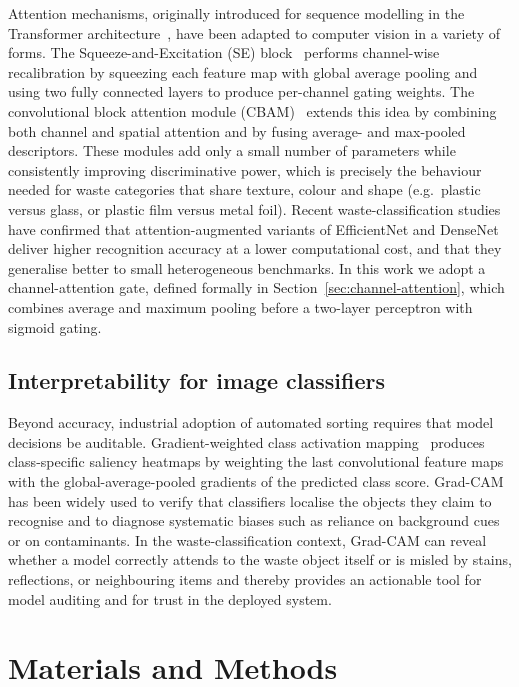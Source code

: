 \documentclass[a4paper,fleqn]{cas-dc}
\begin{document}
Attention mechanisms, originally introduced for sequence modelling in the
Transformer architecture~\cite{vaswani_attention}, have been adapted to
computer vision in a variety of forms. The Squeeze-and-Excitation (SE)
block~\cite{hu_senet} performs channel-wise recalibration by squeezing each
feature map with global average pooling and using two fully connected layers
to produce per-channel gating weights. The convolutional block attention
module (CBAM)~\cite{woo_cbam} extends this idea by combining both channel and
spatial attention and by fusing average- and max-pooled descriptors. These
modules add only a small number of parameters while consistently improving
discriminative power, which is precisely the behaviour needed for waste
categories that share texture, colour and shape (e.g.\ plastic versus glass,
or plastic film versus metal foil). Recent waste-classification studies have
confirmed that attention-augmented variants of EfficientNet and DenseNet
deliver higher recognition accuracy at a lower computational cost, and that
they generalise better to small heterogeneous benchmarks. In this work we
adopt a channel-attention gate, defined formally in
Section~\ref{sec:channel-attention}, which combines average and maximum
pooling before a two-layer perceptron with sigmoid gating.

\subsection{Interpretability for image classifiers}

Beyond accuracy, industrial adoption of automated sorting requires that model
decisions be auditable. Gradient-weighted class activation
mapping~\cite{selvaraju_gradcam} produces class-specific saliency heatmaps by
weighting the last convolutional feature maps with the global-average-pooled
gradients of the predicted class score. Grad-CAM has been widely used to
verify that classifiers localise the objects they claim to recognise and to
diagnose systematic biases such as reliance on background cues or on
contaminants. In the waste-classification context, Grad-CAM can reveal
whether a model correctly attends to the waste object itself or is misled
by stains, reflections, or neighbouring items and thereby provides an
actionable tool for model auditing and for trust in the deployed system.

\section{Materials and Methods}\label{sec:methods}
\end{document}
